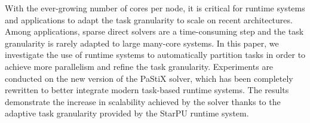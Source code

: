 With the ever-growing number of cores per node, it is critical for
runtime systems and applications to adapt the task granularity to scale
on recent architectures. Among applications, sparse direct solvers are a
time-consuming step and the task granularity is rarely adapted to large
many-core systems. In this paper, we investigate the use of runtime
systems to automatically partition tasks in order to achieve more
parallelism and refine the task granularity. Experiments are conducted
on the new version of the PaStiX solver, which has been completely
rewritten to better integrate modern task-based runtime systems. The
results demonstrate the increase in scalability achieved by the solver
thanks to the adaptive task granularity provided by the StarPU runtime
system.
